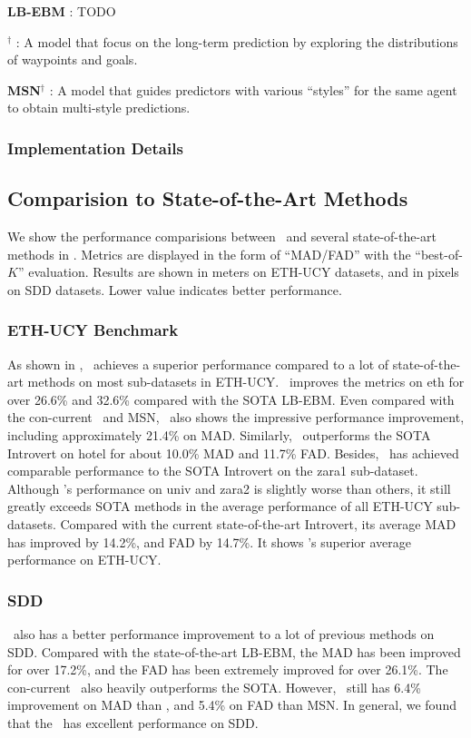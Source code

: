 \documentclass[../paper.tex]{subfiles}
\begin{document}
\textbf{LB-EBM} \cite{pang2021trajectory}:
TODO

\textbf{\YNET}$^{\dagger}$ \cite{mangalam2020goals}:
A model that focus on the long-term prediction by exploring the distributions of waypoints and goals.

\textbf{MSN}$^{\dagger}$ \cite{wong2021msn}:
A model that guides predictors with various ``styles'' for the same agent to obtain multi-style predictions.

\subsubsection{Implementation Details}



\subsection{Comparision to State-of-the-Art Methods}
We show the performance comparisions between \MODEL~and several state-of-the-art methods in .
Metrics are displayed in the form of ``MAD/FAD'' with the ``best-of-$K$'' evaluation\cite{socialGAN,sophie,salzmann2020trajectron}.
Results are shown in meters on ETH-UCY datasets, and in pixels on SDD datasets.
Lower value indicates better performance.

\subsubsection{ETH-UCY Benchmark}
As shown in , \MODEL~achieves a superior performance compared to a lot of state-of-the-art methods on most sub-datasets in ETH-UCY.
\MODEL~improves the metrics on eth for over 26.6\% and 32.6\% compared with the SOTA LB-EBM.
Even compared with the con-current \YNET~and MSN, \MODEL~also shows the impressive performance improvement, including approximately 21.4\% on MAD.
Similarly, \MODEL~outperforms the SOTA Introvert on hotel for about 10.0\% MAD and 11.7\% FAD.
Besides, \MODEL~has achieved comparable performance to the SOTA Introvert on the zara1 sub-dataset.
Although \MODEL's performance on univ and zara2 is slightly worse than others, it still greatly exceeds SOTA methods in the average performance of all ETH-UCY sub-datasets.
Compared with the current state-of-the-art Introvert, its average MAD has improved by 14.2\%, and FAD by 14.7\%.
It shows \MODEL's superior average performance on ETH-UCY.

\subsubsection{SDD}
\MODEL~also has a better performance improvement to a lot of previous methods on SDD.
Compared with the state-of-the-art LB-EBM, the MAD has been improved for over 17.2\%, and the FAD has been extremely improved for over 26.1\%.
The con-current \YNET~also heavily outperforms the SOTA.
However, \MODEL~still has 6.4\% improvement on MAD than \YNET, and 5.4\% on FAD than MSN.
In general, we found that the \MODEL~has excellent performance on SDD.
\end{document}
